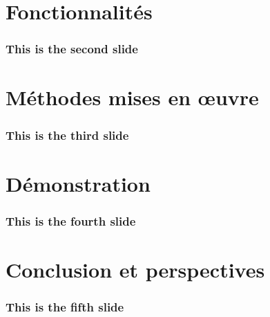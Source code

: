 \documentclass{beamer}
\begin{document}
\section{Fonctionnalités}
\begin{frame}
\frametitle{This is the second slide}
\end{frame}

\section{Méthodes mises en œuvre}
\begin{frame}
\frametitle{This is the third slide}
\end{frame}

\section{Démonstration}
\begin{frame}
\frametitle{This is the fourth slide}
\end{frame}

\section{Conclusion et perspectives}
\begin{frame}
\frametitle{This is the fifth slide}
\end{frame}
\end{document}
